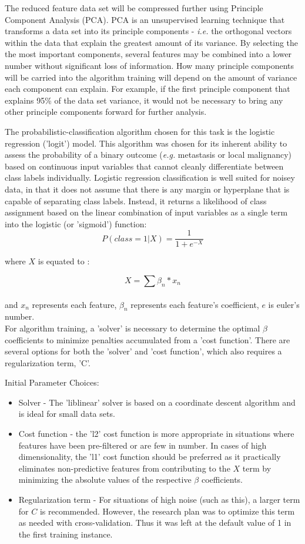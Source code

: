 \documentclass[final]{article}
\begin{document}
The reduced feature data set will be compressed further using Principle Component
Analysis (PCA).  PCA is an unsupervised learning technique that transforms a
data set into its principle components - \textit{i.e.} the orthogonal vectors within the
data that explain the greatest amount of its variance.  By selecting the
the most important components, several features may be combined into a lower
number without significant loss of information.  How many principle components
will be carried into the algorithm training will depend on the amount of variance
each component can explain.  For example, if the first principle component that
explains 95\% of the data set variance, it would not be necessary to bring any other
principle components forward for further analysis.

The probabilistic-classification algorithm chosen for this task is the logistic
regression ('logit') model.  This algorithm was chosen for its inherent ability
to assess the probability of a binary outcome (\textit{e.g.} metastasis or local
malignancy) based on continuous input variables that cannot cleanly differentiate between
class labels individually.  Logistic regression classification is well suited
for noisey data, in that it does not assume that there is any margin or hyperplane that
is capable of separating class labels.  Instead, it returns a likelihood of class assignment
based on the linear combination of input variables as a single term into the logistic (or 'sigmoid')
function:
\\
$$ P(class = 1 | X) = \frac{1}{1+e^{-X}}$$

where $X$ is equated to :

$$ X = \sum{ \beta_{n}*x_{n}} $$
\\
and $x_{n}$ represents each feature, $\beta_{n}$ represents each feature's coefficient, $e$ is
euler's number.
\\
For algorithm training, a 'solver' is necessary to determine the optimal $\beta$
coefficients to minimize penalties accumulated from a 'cost function'.  There are
several options for both the 'solver' and 'cost function', which also requires
a regularization term, 'C'.

Initial Parameter Choices:
\begin{itemize}
  \item Solver - The 'liblinear' solver is based on a coordinate descent algorithm and
  is ideal for small data sets.
  \item Cost function - the 'l2' cost function is more appropriate in situations
  where features have been pre-filtered or are few in number.  In cases of high
  dimensionality, the 'l1' cost function should be preferred as it practically eliminates
  non-predictive features from contributing to the $X$ term by minimizing the absolute
  values of the respective $\beta$ coefficients.
  \item Regularization term - For situations of high noise (such as this), a larger term
  for $C$ is recommended.  However, the research plan was to optimize this term as needed with
  cross-validation.  Thus it was left at the default value of 1 in the first training instance.
\end{itemize}
\end{document}
